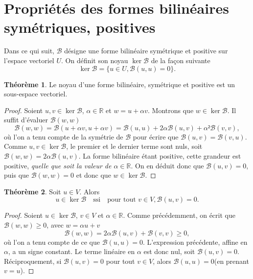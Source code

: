 \documentclass[12pt, final]{amsart}
\theoremstyle{definition}
\newtheorem{theorem}{Théorème}
\newcommand{\reals}{\mathbb{R}}
\begin{document}
\section{Propriétés des formes bilinéaires symétriques, positives}

Dans ce qui suit, \(\mathcal{B}\) désigne une forme bilinéaire symétrique et
positive sur l'espace vectoriel \(U\). On définit son noyau \(\ker \mathcal{B}\)
de la façon suivante
\begin{equation}
 \ker \mathcal{B}= \bigl\{ u ∈ U, \mathcal{B}(u, u) = 0 \bigr\} .
\end{equation}

\begin{theorem}
  Le noyau d'une forme bilinéaire, symétrique et positive est un sous-espace
  vectoriel.
\end{theorem}
\begin{proof}
  Soient \(u, v∈\ker \mathcal{B}\), \(α∈\reals\) et \(w = u + α v\). Montrons
  que \(w ∈ \ker\mathcal{B}\). Il suffit d'évaluer \(\mathcal{B}(w, w)\)
 \begin{equation}
   \mathcal{B}(w, w) = \mathcal{B}(u + α v, u + α v)
   = \mathcal{B}(u, u) + 2 α \mathcal{B}(u, v) + α² \mathcal{B}(v, v),
 \end{equation}
 où l'on a tenu compte de la symétrie de \(\mathcal{B}\) pour écrire que
 \(\mathcal{B}(u, v) =\mathcal{B}(v, u)\). Comme \(u, v ∈ \ker\mathcal{B}\), le
 premier et le dernier terme sont nuls, soit
 \(\mathcal{B}(w, w) = 2α \mathcal{B}(u, v)\). La forme bilinéaire étant
 positive, cette grandeur est positive, \emph{quelle que soit la valeur de
   \(α∈\reals\)}. On en déduit donc que \(\mathcal{B}(u, v) = 0\), puis que
 \(\mathcal{B}(w, w) = 0\) et donc que \(w ∈ \ker\mathcal{B}\).
\end{proof}

\begin{theorem}
 Soit \(u∈V\). Alors
 \begin{equation}
  u ∈ \ker\mathcal{B} \quad \text{ssi} \quad \text{pour tout } v ∈ V, \mathcal{B}(u, v) = 0.
 \end{equation}
\end{theorem}

\begin{proof}
  Soient \(u∈\ker \mathcal{B}\), \(v∈V\) et \(α∈\reals\). Comme précédemment, on
  écrit que \(\mathcal{B}(w, w) ≥ 0\), avec \(w = α u + v\)
 \begin{equation}
  \mathcal{B}(w, w) = 2 α \mathcal{B}(u, v) +\mathcal{B}(v, v) \geq
  0,
 \end{equation}
 où l'on a tenu compte de ce que \(\mathcal{B}(u, u) = 0\). L'expression
 précédente, affine en \(α\), a un signe constant. Le terme linéaire en \(α\)
 est donc nul, soit \(\mathcal{B}(u, v) = 0\).  Réciproquement, si
 \(\mathcal{B}(u, v) = 0\) pour tout \(v∈V\), alors \(\mathcal{B}(u, u) = 0\)(en
 prenant \(v = u\)).
\end{proof}
\end{document}
